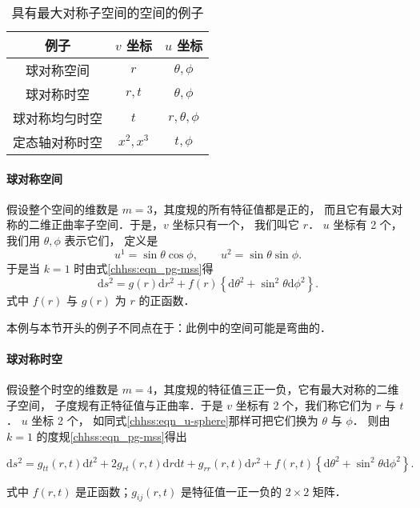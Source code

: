 \begin{table}[htb]
    \centering
    \caption{具有最大对称子空间的空间的例子} \label{chhss:tab-msss}
    \begin{tabular}{c|c|c}
        \hline 例子 & $v$ 坐标 & $u$ 坐标 \\
        \hline 球对称空间 & $r$ & $\theta, \phi$ \\
        球对称时空 & $r, t$ & $\theta, \phi$ \\
        球对称均匀时空 & $t$ & $r, \theta, \phi$ \\
        定态轴对称时空 & $x^2,x^3 $ & $t,\phi$ \\
        \hline
    \end{tabular}
\end{table}


\paragraph{球对称空间}
假设整个空间的维数是 $m=3$，其度规的所有特征值都是正的，
而且它有最大对称的二维正曲率子空间．于是，$v$ 坐标只有一个， 我们叫它 $r$．
$u$ 坐标有 2 个，我们用 $\theta, \phi$ 表示它们， 定义是
\begin{equation}\label{chhss:eqn_u-sphere}
    u^1=\sin \theta \cos \phi, \qquad u^2=\sin \theta \sin \phi .
\end{equation}
于是当 $k=1$ 时由式\eqref{chhss:eqn_pg-mss}得
\begin{equation}\label{chhss_eqn_g-sphere}
    \mathrm{d} s^2=g(r) \mathrm{d} r^2+f(r)\left\{\mathrm{d} \theta^2+\sin ^2 \theta \mathrm{d} \phi^2\right\} .
\end{equation}
式中 $f(r)$ 与 $g(r)$ 为 $r$ 的正函数．

本例与本节开头的例子不同点在于：此例中的空间可能是弯曲的．



\paragraph{球对称时空}
假设整个时空的维数是 $m=4$，其度规的特征值三正一负，它有最大对称的二维子空间，
子度规有正特征值与正曲率．于是 $v$ 坐标有 2 个，我们称它们为 $r$ 与 $t$．
$u$ 坐标 2 个， 如同式\eqref{chhss:eqn_u-sphere}那样可把它们换为 $\theta$ 与 $\phi$． 
则由 $k=1$ 的度规\eqref{chhss:eqn_pg-mss}得出
\begin{small}
\begin{equation}\label{chhss_eqn_g-st-sphere}
    \mathrm{d} s^2=  g_{t t}(r, t) \mathrm{d} t^2+2 g_{r t}(r, t) \mathrm{d} r \mathrm{d} t+g_{r r}(r, t) \mathrm{d} r^2 
     +f(r, t)\left\{\mathrm{d} \theta^2+\sin ^2 \theta \mathrm{d} \phi^2\right\} .
\end{equation}
\end{small}
式中 $f(r, t)$ 是正函数；$g_{i j}(r, t)$ 是特征值一正一负的 $2 \times 2$ 矩阵．

